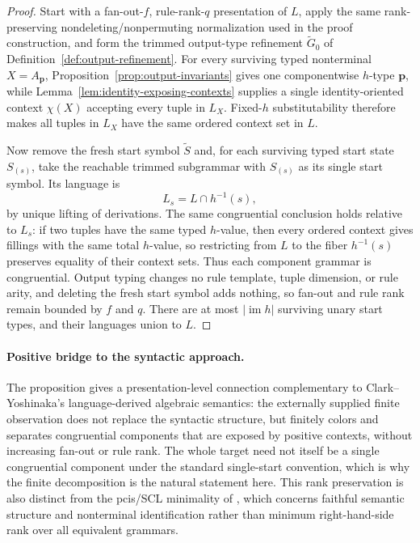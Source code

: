 \documentclass[11pt,a4paper]{article}
\numberwithin{equation}{section}
\theoremstyle{plain}
\theoremstyle{definition}
\theoremstyle{remark}
\begin{document}
\begin{proof}
Start with a fan-out-\(f\), rule-rank-\(q\) presentation of \(L\), apply the
same rank-preserving nondeleting/nonpermuting normalization used in the proof
construction, and form the trimmed output-type refinement
\(\widetilde G_0\) of Definition~\ref{def:output-refinement}.  For every
surviving typed nonterminal \(X=A_{\mathbf p}\),
Proposition~\ref{prop:output-invariants} gives one componentwise \(h\)-type
\(\mathbf p\), while Lemma~\ref{lem:identity-exposing-contexts} supplies a
single identity-oriented context \(\chi(X)\) accepting every tuple in
\(L_X\).  Fixed-\(h\) substitutability therefore makes all tuples in \(L_X\)
have the same ordered context set in \(L\).

Now remove the fresh start symbol \(\widetilde S\) and, for each surviving
typed start state \(S_{(s)}\), take the reachable trimmed subgrammar with
\(S_{(s)}\) as its single start symbol.  Its language is
\[
  L_s=L\cap h^{-1}(s),
\]
by unique lifting of derivations.  The same congruential conclusion holds
relative to \(L_s\): if two tuples have the same typed \(h\)-value, then every
ordered context gives fillings with the same total \(h\)-value, so restricting
from \(L\) to the fiber \(h^{-1}(s)\) preserves equality of their context
sets.  Thus each component grammar is congruential.  Output typing changes no
rule template, tuple dimension, or rule arity, and deleting the fresh start
symbol adds nothing, so fan-out and rule rank remain bounded by \(f\) and
\(q\).  There are at most \(|\operatorname{im}h|\) surviving unary start
types, and their languages union to \(L\).
\end{proof}

\paragraph{Positive bridge to the syntactic approach.}
The proposition gives a presentation-level connection complementary to
Clark--Yoshinaka's language-derived algebraic semantics: the externally
supplied finite observation does not replace the syntactic structure, but
finitely colors and separates congruential components that are exposed by
positive contexts, without increasing fan-out or rule rank.  The whole target
need not itself be a single congruential component under the standard
single-start convention, which is why the finite decomposition is the natural
statement here.  This rank preservation is also distinct from the pcis/SCL
minimality of \cite{ClarkYoshinaka2014Algebraic}, which concerns faithful
semantic structure and nonterminal identification rather than minimum
right-hand-side rank over all equivalent grammars.
\end{document}
